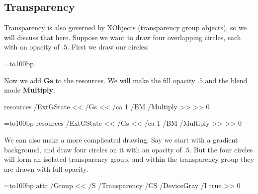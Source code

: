 \subsection{Transparency}

Transparency is also governed by XObjects (transparency group objects), so we will discuss that here.
Suppose we want to draw four overlapping circles, each with an opacity of $.5$.
First we draw our circles:

\blisting
\bgroup
{}=\hbox to100bp{\vrule width0bp height100bp depth0bp%
\hfil}
\elisting

\noindent Now we add {\bf Gs} to the resources.
We will make the fill opacity $.5$ and the blend mode {\bf Multiply}.

\blisting
\pdfxform resources{
    /ExtGState << /Gs <<
        /ca 1
        /BM /Multiply
    >> >>
}0
\xdef\fourcircs{\pdfrefxform\the\pdflastxform\relax}
\egroup
\elisting

\bgroup
{}=\hbox to100bp{\vrule width0bp height100bp depth0bp%
\hfil}
\pdfxform resources{
    /ExtGState << /Gs <<
        /ca 1
        /BM /Multiply
    >> >>
}0
\xdef\fourcircs{\pdfrefxform\the\pdflastxform\relax}
\egroup

\centerline{\fourcircs}

We can also make a more complicated drawing.
Say we start with a gradient background, and draw four circles on it with an opacity of $.5$.
But the four circles will form an isolated transparency group, and within the transparency group they are
drawn with full opacity.

\blisting
\bgroup
{}=\hbox to100bp{\vrule width0bp height100bp depth0bp%
\hfil}
\immediate\pdfxform attr{
    /Group <<
        /S /Transparency
        /CS /DeviceGray
        /I true
    >>
}0
\edef\fourcircsform{\the\pdflastxform}

